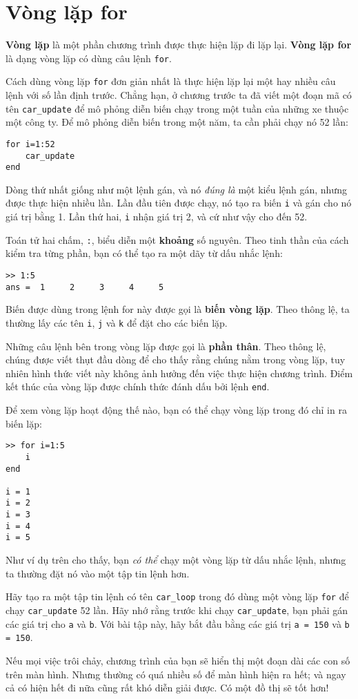\documentclass[12pt]{book}
\begin{document}
\section{Vòng lặp for}

{\bf Vòng lặp} là một phần chương trình được thực hiện lặp đi
lặp lại. {\bf Vòng lặp for} là dạng vòng lặp có dùng câu lệnh {\tt for}.

Cách dùng vòng lặp {\tt for} đơn giản nhất là thực hiện lặp lại
một hay nhiều câu lệnh với số lần định trước. Chẳng hạn, ở chương
trước ta đã viết một đoạn mã có tên \verb#car_update# để 
mô phỏng diễn biến chạy trong một tuần của những xe thuộc
một công ty. Để mô phỏng diễn biến trong một năm, ta cần phải
chạy nó 52 lần:

\begin{verbatim}
for i=1:52
    car_update
end
\end{verbatim}
%
Dòng thứ nhất giống như một lệnh gán, và nó {\em đúng là} một
kiểu lệnh gán, nhưng được thực hiện nhiều lần. Lần đầu tiên được
chạy, nó tạo ra biến {\tt i} và gán cho nó giá trị bằng 1. Lần thứ hai,
{\tt i} nhận giá trị 2, và cứ như vậy cho đến 52.

Toán tử hai chấm, {\tt :}, biểu diễn một {\bf khoảng} số nguyên. Theo
tinh thần của cách kiểm tra từng phần, bạn có thể tạo ra một dãy
từ dấu nhắc lệnh:

\begin{verbatim} 
>> 1:5
ans =  1     2     3     4     5
\end{verbatim}
%
Biến được dùng trong lệnh for này được gọi là {\bf biến vòng lặp}.
Theo thông lệ, ta thường lấy các tên {\tt i}, {\tt j} và {\tt k} để đặt cho
các biến lặp.

Những câu lệnh bên trong vòng lặp được gọi là {\bf phần thân}.  
Theo thông lệ, chúng được viết thụt đầu dòng để cho thấy rằng
chúng nằm trong vòng lặp, tuy nhiên hình thức viết này không ảnh
hưởng đến việc thực hiện chương trình. Điểm kết thúc của vòng
lặp được chính thức đánh dấu bởi lệnh {\tt end}.

Để xem vòng lặp hoạt động thế nào, bạn có thể chạy vòng lặp
trong đó chỉ in ra biến lặp:

\begin{verbatim}
>> for i=1:5
    i
end

i = 1
i = 2
i = 3
i = 4
i = 5
\end{verbatim}
%
Như ví dụ trên cho thấy, bạn {\em có thể} chạy một vòng lặp
từ dấu nhắc lệnh, nhưng ta thường đặt nó vào một tập tin lệnh hơn.

\begin{ex}
Hãy tạo ra một tập tin lệnh có tên \verb#car_loop# trong đó dùng
một vòng lặp {\tt for} để chạy \verb#car_update# 52 lần. Hãy nhớ
rằng trước khi chạy \verb#car_update#, bạn phải gán các giá trị
cho {\tt a} và {\tt b}. Với bài tập này, hãy bắt đầu bằng các giá trị  
{\tt a = 150} và {\tt b = 150}.

Nếu mọi việc trôi chảy, chương trình của bạn sẽ hiển thị một 
đoạn dài các con số trên màn hình. Nhưng thường có quá nhiều
số để màn hình hiện ra hết; và ngay cả có hiện hết đi nữa cũng
rất khó diễn giải được. Có một đồ thị sẽ tốt hơn!
\end{ex}
\end{document}
